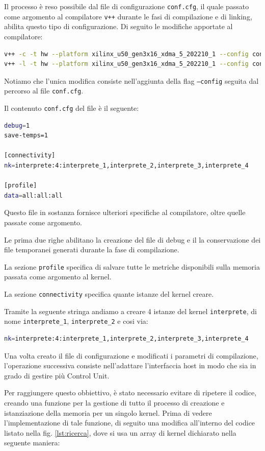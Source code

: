 Il processo è reso possibile dal file di configurazione \texttt{conf.cfg}, il quale passato come argomento al compilatore \texttt{v++} durante le fasi di compilazione e di linking, abilita questo tipo di configurazione. Di seguito le modifiche apportate al compilatore:

\begin{lstlisting}[language=Bash]
v++ -c -t hw --platform xilinx_u50_gen3x16_xdma_5_202210_1 --config conf.cfg -k vadd -I/src src/vadd.cpp -o ./vadd.xo
v++ -l -t hw --platform xilinx_u50_gen3x16_xdma_5_202210_1 --config conf.cfg ./vadd.xo -o ./vadd.xclbin
\end{lstlisting}
Notiamo che l'unica modifica consiste nell'aggiunta della flag  \texttt{--config} seguita dal percorso al file \texttt{conf.cfg}.

Il contenuto \texttt{conf.cfg} del file è il seguente:
\begin{lstlisting}[language=Bash]
debug=1
save-temps=1

[connectivity]
nk=interprete:4:interprete_1,interprete_2,interprete_3,interprete_4

[profile]
data=all:all:all
\end{lstlisting}
Questo file in sostanza fornisce ulteriori specifiche al compilatore, oltre quelle passate come argomento.

Le prima due righe abilitano la creazione del file di debug e il la conservazione dei file temporanei generati durante la fase di compilazione.

La sezione \texttt{profile} specifica di salvare tutte le metriche disponibili sulla memoria passata come argomento al kernel.

La sezione \texttt{connectivity} specifica quante istanze del kernel creare.

\noindent Tramite la seguente stringa andiamo a creare 4 istanze del kernel \texttt{interprete}, di nome \texttt{interprete\_1}, \texttt{interprete\_2} e cosi via:
\begin{lstlisting}[language=Bash]
nk=interprete:4:interprete_1,interprete_2,interprete_3,interprete_4
\end{lstlisting}

Una volta creato il file di configurazione e modificati i parametri di compilazione, l'operazione successiva consiste nell'adattare l'interfaccia host in modo che sia in grado di gestire più Control Unit.

Per raggiungere questo obbiettivo, è stato necessario evitare di ripetere il codice, creando una funzione per la gestione di tutto il processo di creazione e istanziazione della memoria per un singolo kernel. Prima di vedere l'implementazione di tale funzione, di seguito una modifica all'interno del codice listato nella fig. \ref{lst:ricerca}, dove si usa un array di kernel dichiarato nella seguente maniera: 

